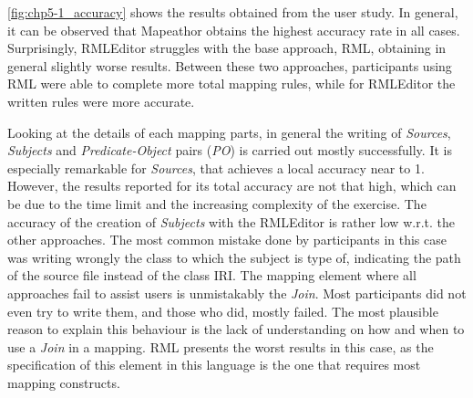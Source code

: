 \cref{fig:chp5-1_accuracy} shows the results obtained from the user study. In general, it can be observed that Mapeathor obtains the highest accuracy rate in all cases. Surprisingly, RMLEditor struggles with the base approach, RML, obtaining in general slightly worse results. Between these two approaches, participants using RML were able to complete more total mapping rules, while for RMLEditor the written rules were more accurate. 

Looking at the details of each mapping parts, in general the writing of \textit{Sources}, \textit{Subjects} and \textit{Predicate-Object} pairs (\textit{PO}) is carried out mostly successfully. It is especially remarkable for \textit{Sources}, that achieves a local accuracy near to 1. However, the results reported for its total accuracy are not that high, which can be due to the time limit and the increasing complexity of the exercise. The accuracy of the creation of \textit{Subjects} with the RMLEditor is rather low w.r.t. the other approaches. The most common mistake done by participants in this case was writing wrongly the class to which the subject is type of, indicating the path of the source file instead of the class IRI. The mapping element where all approaches fail to assist users is unmistakably the \textit{Join}. Most participants did not even try to write them, and those who did, mostly failed. The most plausible reason to explain this behaviour is the lack of understanding on how and when to use a \textit{Join} in a mapping. RML presents the worst results in this case, as the specification of this element in this language is the one that requires most mapping constructs. 


